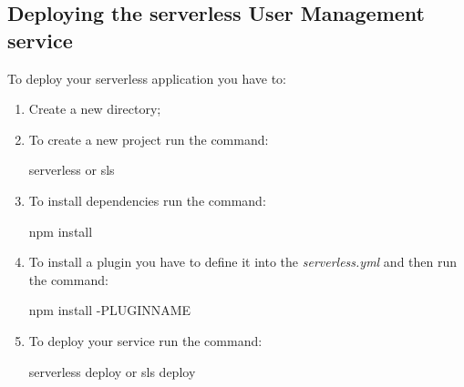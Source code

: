 \subsection{Deploying the serverless User Management service}
To deploy your serverless application you have to:
\begin{enumerate}
	\item Create a new directory;
	\item To create a new project run the command: \begin{ttfamily}serverless or sls\end{ttfamily}
	\item To install dependencies run the command: 
	\begin{ttfamily}npm install\end{ttfamily}
	\item To install a plugin you have to define it into the \emph{serverless.yml} and then run the command: 
	\begin{ttfamily}npm install -PLUGINNAME\end{ttfamily}
	\item To deploy your service run the command: 
	\begin{ttfamily}serverless deploy or sls deploy\end{ttfamily}
\end{enumerate}
